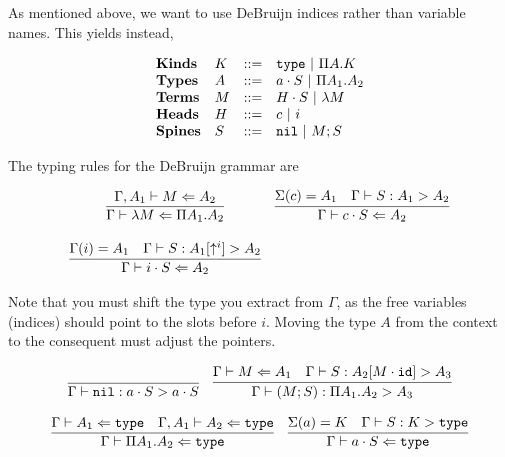 \documentclass[11pt,twoside]{article}
\begin{document}
As mentioned above, we want to use DeBruijn indices rather
than variable names.  This yields instead,

\renewcommand{\PiTyp}[2]{\Pi #1.#2}
\renewcommand{\Lam}[1]{\lambda #1}

$$
\begin{array}{llll}
\mathbf{Kinds} & K & ::= & \Type \Spb \PiTyp{A}{K} \\
\mathbf{Types} & A & ::= & a\cdot S \Spb \PiTyp{A_1}{A_2} \\
\mathbf{Terms} & M & ::= & H\cdot S \Spb \Lam{M} \\
\mathbf{Heads} & H & ::= & c \Spb i\\
\mathbf{Spines} & S & ::= & \Nil \Spb M;S\\
\end{array} 
$$

The typing rules for the DeBruijn grammar are

\newcommand{\CheckTy}[3][\Gamma]{#1\vdash #2 \Leftarrow #3}
\newcommand{\Focus}[4][\Gamma]{#1\vdash #2 : #3 > #4}

\bigskip 
\framebox{$\CheckTy{M}{A}$}
\bigskip 

$$
\begin{array}{cc}
\infer{\CheckTy{\Lam{M}}{\PiTyp{A_1}{A_2}}}{\CheckTy[\Gamma,A_1]{M}{A_2}} &
\infer{\CheckTy{c\cdot S}{A_2}}{\Sigma(c)=A_1 & \Focus{S}{A_1}{A_2}} \\\\
\infer{\CheckTy{i\cdot S}{A_2}}{\Gamma(i)=A_1 & \Focus{S}{A_1[\Shift^i]}{A_2}}
\end{array} 
$$

Note that you must shift the type you extract from $\Gamma$, as the
free variables (indices) should point to the slots before $i$.  Moving
the type $A$ from the context to the consequent must adjust the pointers.

\bigskip 
\framebox{$\Focus{S}{A_1}{A_2}$}
\bigskip 

$$
\begin{array}{lr}
\infer{\Focus{\Nil}{a\cdot S}{a\cdot S}}{} & 
\infer{\Focus{(M;S)}{\PiTyp{A_1}{A_2}}{A_3}}{\CheckTy{M}{A_1} & \Focus{S}{A_2[M\cdot\IdSub]}{A_3}}
\end{array} 
$$

\bigskip 
\framebox{$\CheckTy{A}{\Type}$}
\bigskip 

$$
\begin{array}{cc}
\infer{\CheckTy{\PiTyp{A_1}{A_2}}{\Type}}{\CheckTy{A_1}{\Type} & \CheckTy[\Gamma,A_1]{A_2}{\Type}} &
\infer{\CheckTy{a\cdot S}{\Type}}{\Sigma(a) = K & \Focus{S}{K}{\Type}}
\end{array} 
$$
\end{document}
